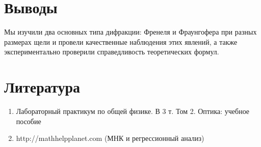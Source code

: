 \documentclass[a4paper, 12pt]{article}%
\begin{document}
\section{Выводы}

Мы изучили два основных типа дифракции: Френеля и Фраунгофера при разных размерах щели и провели качественные наблюдения этих явлений, а также экспериментально проверили справедливость теоретических формул.


\section{Литература}

\begin{enumerate}

\item Лабораторный практикум по общей физике. В 3 т. Том 2. Оптика: учебное пособие

\item http://mathhelpplanet.com (МНК и регрессионный анализ)


\end{enumerate}	
\end{document}
